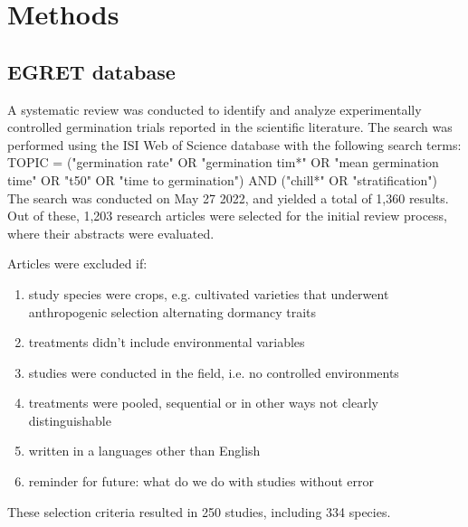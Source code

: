 \documentclass{article}
\begin{document}
\renewcommand{\bibname}{References}%




\section*{Methods} %
\subsection*{EGRET database}

A systematic review was conducted to identify and analyze experimentally controlled germination trials reported in the scientific literature. The search was performed using the ISI Web of Science database with the following search terms: \\
TOPIC = ("germination rate" OR "germination tim*" OR "mean germination time" OR "t50" OR "time to germination") AND ("chill*" OR "stratification") \\

The search was conducted on May 27 2022,%
and yielded a total of 1,360 results. Out of these, 1,203 research articles were selected for the initial review process, where their abstracts were evaluated.

Articles were excluded if:\\

\begin{enumerate}
\item study species were crops, e.g. cultivated varieties that underwent anthropogenic selection alternating dormancy traits %
\item treatments didn't include environmental variables
\item studies were conducted in the field, i.e. no controlled environments
\item treatments were pooled, sequential or in other ways not clearly distinguishable
\item written in a languages other than English %
\item reminder for future: what do we do with studies without error

\end{enumerate} 
These selection criteria resulted in 250 studies, including 334 species. %
\end{document}
